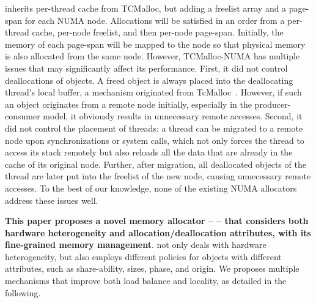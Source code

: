 \TN{} inherits per-thread cache from TCMalloc, but adding a freelist array and a page-span for each NUMA node. Allocations will be satisfied in an order from a per-thread cache, per-node freelist, and then per-node page-span. Initially, the memory of each page-span will be mapped to the node so that physical memory is also allocated from the same node. However, TCMalloc-NUMA has multiple issues that may significantly affect its performance. First, it did not control deallocations of objects. A freed object is always placed into the deallocating thread's local buffer, a mechanism originated from TcMalloc~\cite{tcmalloc}. However, if such an object originates from a remote node initially, especially in the producer-consumer model, it obviously results in unnecessary remote accesses. Second, it did not control the placement of threads: a thread can be migrated to a remote node upon synchronizations or system calls, which not only forces the thread to access its stack remotely but also reloads all the data that are already in the cache of its original node. Further, after migration, all deallocated objects of the thread are later put into the freelist of the new node, causing unnecessary remote accesses. To the best of our knowledge, none of the existing NUMA allocators address these issues well.

\textbf{This paper proposes a novel memory allocator -- \NM{} -- that considers both hardware heterogeneity and allocation/deallocation attributes, with its fine-grained memory management}. \NM{} not only deals with hardware heterogeneity, but also employs different policies for objects with different attributes, such as share-ability, sizes, phase, and origin. We proposes multiple mechanisms that improve both load balance and locality, as detailed in the following.   


